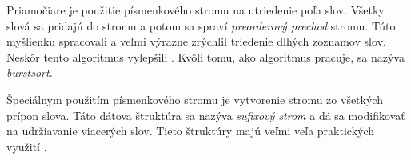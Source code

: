 Priamočiare je použitie písmenkového stromu na utriedenie poľa slov. 
Všetky slová sa pridajú do stromu a potom sa spraví \emph{preorderový prechod} 
stromu. Túto myšlienku spracovali \citet{burstsort1} a veľmi výrazne zrýchlil 
triedenie dlhých zoznamov slov. Neskôr tento algoritmus vylepšili 
\citet{burstsort2}. Kvôli tomu, ako algoritmus pracuje, 
sa nazýva \emph{burstsort}.

Špeciálnym použitím písmenkového stromu je vytvorenie stromu zo všetkých 
prípon slova. Táto dátova štruktúra sa nazýva \emph{sufixový strom} a dá sa 
mo\-di\-fi\-ko\-vať na udržiavanie viacerých slov. Tieto štruktúry majú 
veľmi veľa praktických využití \citep{gusfield}. 


